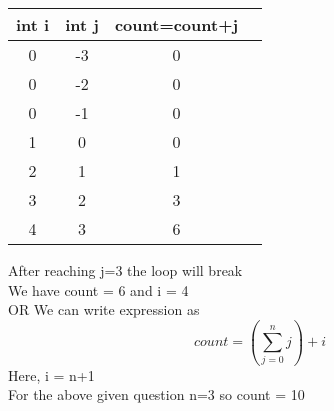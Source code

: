 \documentclass[journal,12pt,twocolumn]{IEEEtran}
\begin{document}
    \begin{table}[ht]
        \centering
        \begin{tabular}{|c|c|c|c|}
        \hline
        int i & int j & count=count+j \\
        \hline
        0 & -3 & 0 \\
        \hline
        0 & -2 & 0 \\
        \hline
        0 & -1 & 0 \\
        \hline
        1 &  0 & 0 \\
        \hline
        2 &  1 & 1 \\
        \hline
        3 &  2 & 3 \\
        \hline
        4 &  3 & 6 \\
        \hline
        \end{tabular}
        \caption{}
        \label{}
    \end{table}
 After reaching j=3 the loop will break\\
 We have count = 6 and i = 4 \\
 OR We can write expression as \\
 \begin{equation}
     count = (\sum_{j=0}^{n} j) + i
 \end{equation}
 Here,\hspace{0.5in} i = n+1\\
 For the above given question n=3 so count = 10
 
\end{document}
